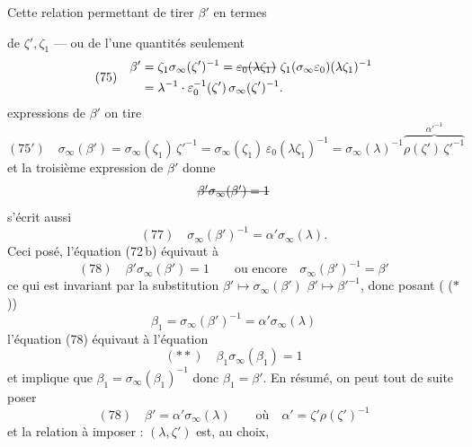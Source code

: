 \documentclass[11pt,a4paper]{article}
\begin{document}
Cette relation permettant de tirer $\beta'$ en termes

de $\zeta', \zeta_1$ — ou de l'une  quantités seulement
\[
(75)\quad
\begin{aligned}
\beta' &= \zeta_1 \sigma_\infty(\zeta')^{-1} = \text{\struck{$\varepsilon_0(\lambda\zeta_1)$}}\ \zeta_1 (\sigma_\infty\varepsilon_0)(\lambda\zeta_1)^{-1} \\
&= \lambda^{-1} \cdot \varepsilon_0^{-1}(\zeta')\, \sigma_\infty(\zeta')^{-1}.
\end{aligned}
\]
  expressions de $\beta'$ on tire
\[
(75')\quad \sigma_\infty(\beta') = \sigma_\infty(\zeta_1)\, \zeta'^{-1} = \sigma_\infty(\zeta_1)\, \varepsilon_0(\lambda\zeta_1)^{-1}
= \sigma_\infty(\lambda)^{-1} \overbrace{\rho(\zeta')\, \zeta'^{-1}}^{\alpha'^{-1}}
\]
et la troisième expression de $\beta'$ donne \struck{\ill{}}
\[
\text{\struck{$\beta' \sigma_\infty(\beta') = 1$}}
\]
s'écrit aussi
\[
(77)\quad \sigma_\infty(\beta')^{-1} = \alpha' \sigma_\infty(\lambda).
\]
Ceci posé, l'équation (72\,b) équivaut à
\[
(78)\quad \beta' \sigma_\infty(\beta') = 1 \qquad \text{ou encore} \quad \sigma_\infty(\beta')^{-1} = \beta'
\]
ce qui est invariant par la substitution $\beta' \mapsto \sigma_\infty(\beta')$  $\beta' \mapsto \beta'^{-1}$, donc posant ( ($\ast$))
\[
\beta_1 = \sigma_\infty(\beta')^{-1} = \alpha' \sigma_\infty(\lambda)
\]
l'équation (78) équivaut à l'équation
\[
(\ast\ast)\quad \beta_1 \sigma_\infty(\beta_1) = 1
\]
et implique que $\beta_1 = \sigma_\infty(\beta_1)^{-1}$ donc $\beta_1 = \beta'$. En résumé, on peut tout de suite poser
\[
(78)\quad \beta' = \alpha' \sigma_\infty(\lambda) \qquad \text{où} \quad \alpha' = \zeta' \rho(\zeta')^{-1}
\]
et la relation à imposer : $(\lambda, \zeta')$ est, au choix,
\end{document}

